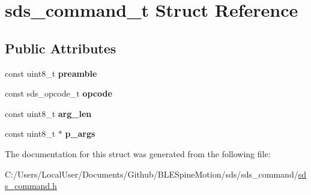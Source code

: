 \hypertarget{structsds__command__t}{}\section{sds\+\_\+command\+\_\+t Struct Reference}
\label{structsds__command__t}
\subsection*{Public Attributes}
\begin{DoxyCompactItemize}
\item 
\mbox{\label{structsds__command__t_a2d520866f37978e023f947bfa4cde8b1}} 
const uint8\+\_\+t {\bfseries preamble}
\item 
\mbox{\label{structsds__command__t_a7082e99faba34f0c964bacda1014d46b}} 
const sds\+\_\+opcode\+\_\+t {\bfseries opcode}
\item 
\mbox{\label{structsds__command__t_a8b73a743271a9237bcae906649ee8b29}} 
const uint8\+\_\+t {\bfseries arg\+\_\+len}
\item 
\mbox{\label{structsds__command__t_a121ecbfea8baaae44e580bc7e20791c9}} 
const uint8\+\_\+t $\ast$ {\bfseries p\+\_\+args}
\end{DoxyCompactItemize}


The documentation for this struct was generated from the following file\+:\begin{DoxyCompactItemize}
\item 
C\+:/\+Users/\+Local\+User/\+Documents/\+Github/\+B\+L\+E\+Spine\+Motion/sds/sds\+\_\+command/\mbox{\hyperlink{sds__command_8h}{sds\+\_\+command.\+h}}\end{DoxyCompactItemize}
